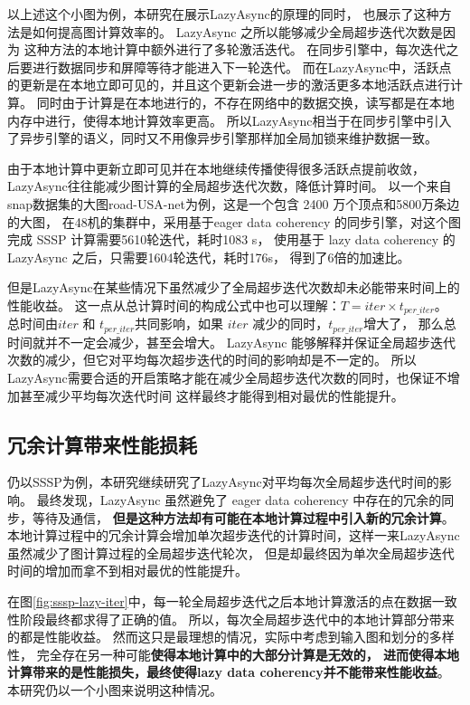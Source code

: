 以上述这个小图为例，本研究在展示LazyAsync的原理的同时，
也展示了这种方法是如何提高图计算效率的。
LazyAsync 之所以能够减少全局超步迭代次数是因为
这种方法的本地计算中额外进行了多轮激活迭代。
在同步引擎中，每次迭代之后要进行数据同步和屏障等待才能进入下一轮迭代。
而在LazyAsync中，活跃点的更新是在本地立即可见的，并且这个更新会进一步的激活更多本地活跃点进行计算。
同时由于计算是在本地进行的，不存在网络中的数据交换，读写都是在本地内存中进行，使得本地计算效率更高。
所以LazyAsync相当于在同步引擎中引入了异步引擎的语义\cite{Ju@MACS17}，同时又不用像异步引擎那样加全局加锁来维护数据一致\cite{Xie@PPoPP15}。

由于本地计算中更新立即可见并在本地继续传播使得很多活跃点提前收敛，LazyAsync往往能减少图计算的全局超步迭代次数，降低计算时间。
以一个来自snap\cite{SNAP}数据集的大图road-USA-net为例，这是一个包含 2400 万个顶点和5800万条边的大图，
在48机的集群中，采用基于eager data coherency 的同步引擎，对这个图完成 SSSP 计算需要5610轮迭代，耗时1083 s， 
使用基于 lazy data coherency 的 LazyAsync 之后，只需要1604轮迭代，耗时176s，
得到了6倍的加速比。

但是LazyAsync在某些情况下虽然减少了全局超步迭代次数却未必能带来时间上的性能收益。
这一点从总计算时间的构成公式\cite{bsp@1990}中也可以理解：$T=iter \times t_{per\_iter}$。
总时间由$iter$ 和 $t_{per\_iter}$共同影响，如果 $iter$ 减少的同时，$t_{per\_iter}$增大了，
那么总时间就并不一定会减少，甚至会增大。
LazyAsync 能够解释并保证全局超步迭代次数的减少，但它对平均每次超步迭代的时间的影响却是不一定的。
所以LazyAsync需要合适的开启策略才能在减少全局超步迭代次数的同时，也保证不增加甚至减少平均每次迭代时间
这样最终才能得到相对最优的性能提升。

\subsection{冗余计算带来性能损耗}
仍以SSSP为例，本研究继续研究了LazyAsync对平均每次全局超步迭代时间的影响。
最终发现，LazyAsync 虽然避免了 eager data coherency 中存在的冗余的同步，等待及通信，
\textbf{但是这种方法却有可能在本地计算过程中引入新的冗余计算}。
本地计算过程中的冗余计算会增加单次超步迭代的计算时间，这样一来LazyAsync虽然减少了图计算过程的全局超步迭代轮次，
但是却最终因为单次全局超步迭代时间的增加而拿不到相对最优的性能提升。


在图\ref{fig:sssp-lazy-iter}中，每一轮全局超步迭代之后本地计算激活的点在数据一致性阶段最终都求得了正确的值。
所以，每次全局超步迭代中的本地计算部分带来的都是性能收益。
然而这只是最理想的情况，实际中考虑到输入图和划分的多样性，
完全存在另一种可能\textbf{使得本地计算中的大部分计算是无效的，
进而使得本地计算带来的是性能损失，最终使得lazy data coherency并不能带来性能收益}。
本研究仍以一个小图来说明这种情况。


